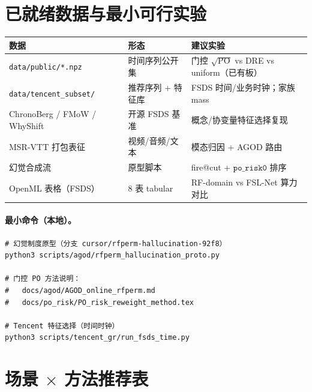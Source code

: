\documentclass[11pt,a4paper,UTF8,fontset=none]{ctexart}
\begin{document}
\section{已就绪数据与最小可行实验}
\label{sec:data}

\begin{center}
\begin{tabular}{@{}p{3.4cm}p{3.8cm}p{5.0cm}@{}}
\toprule
数据 & 形态 & 建议实验 \\
\midrule
\texttt{data/public/*.npz} & 时间序列公开集 & 门控 \(\sqrt{\mathrm{PO}}\) vs DRE vs uniform（已有板） \\
\texttt{data/tencent\_subset/} & 推荐序列 + 特征库 & FSDS 时间/业务时钟；家族 mass \\
ChronoBerg / FMoW / WhyShift & 开源 FSDS 基准 & 概念/协变量特征选择复现 \\
MSR-VTT 打包表征 & 视频/音频/文本 & 模态归因 + AGOD 路由 \\
幻觉合成流 & 原型脚本 & fire@cut + \(\texttt{po\_risk0}\) 排序 \\
OpenML 表格（FSDS） & 8 表 tabular & RF-domain vs FSL-Net 算力对比 \\
\bottomrule
\end{tabular}
\end{center}

\paragraph{最小命令（本地）。}
\begin{verbatim}
# 幻觉制度原型（分支 cursor/rfperm-hallucination-92f8）
python3 scripts/agod/rfperm_hallucination_proto.py

# 门控 PO 方法说明：
#   docs/agod/AGOD_online_rfperm.md
#   docs/po_risk/PO_risk_reweight_method.tex

# Tencent 特征选择（时间时钟）
python3 scripts/tencent_gr/run_fsds_time.py
\end{verbatim}

\section{场景 \(\times\) 方法推荐表}
\label{sec:matrix}
\end{document}
